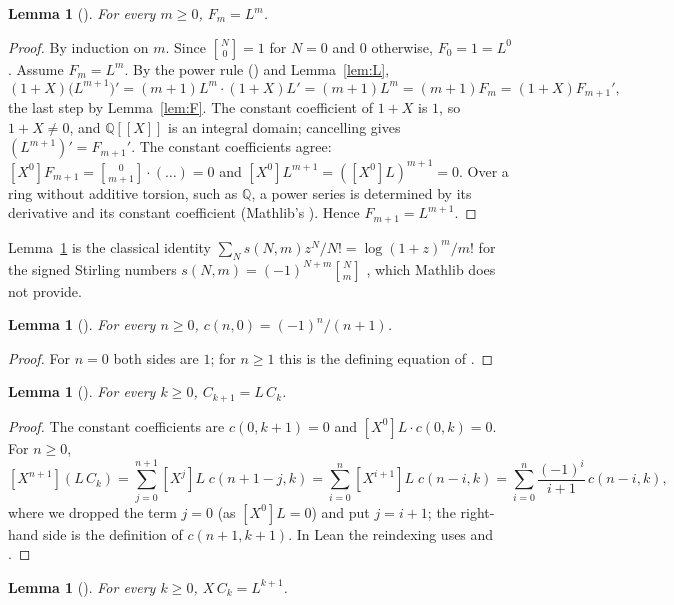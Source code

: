 \documentclass[11pt]{amsart}
\theoremstyle{plain}
\newtheorem{lemma}[theorem]{Lemma}
\theoremstyle{definition}
\newcommand{\Q}{\mathbb{Q}}
\newcommand{\st}[2]{\genfrac{[}{]}{0pt}{}{#1}{#2}}
\newcommand{\fps}{\Q[\![X]\!]}
\newcommand{\coef}[1]{[X^{#1}]}
\begin{document}
\begin{lemma}[]\label{lem:Feq}
For every $m\ge0$, $F_m=L^m$.
\end{lemma}

\begin{proof}
By induction on $m$. Since $\st N0=1$ for $N=0$ and $0$ otherwise, $F_0=1=L^0$.
Assume $F_m=L^m$. By the power rule () and Lemma~\ref{lem:L},
\[
  (1+X)\bigl(L^{m+1}\bigr)'=(m+1)L^m\cdot(1+X)L'=(m+1)L^m=(m+1)F_m=(1+X)F_{m+1}',
\]
the last step by Lemma~\ref{lem:F}. The constant coefficient of $1+X$ is $1$, so $1+X\neq0$, and $\fps$ is an integral domain; cancelling gives $(L^{m+1})'=F_{m+1}'$.
The constant coefficients agree: $\coef0F_{m+1}=\st0{m+1}\cdot(\dots)=0$ and $\coef0L^{m+1}=(\coef0L)^{m+1}=0$.
Over a ring without additive torsion, such as $\Q$, a power series is determined by its derivative and its constant coefficient (Mathlib's ). Hence $F_{m+1}=L^{m+1}$.
\end{proof}

Lemma~\ref{lem:Feq} is the classical identity $\sum_N s(N,m)z^N/N!=\log(1+z)^m/m!$ for the signed Stirling numbers $s(N,m)=(-1)^{N+m}\st Nm$ \cite{Co74}, which Mathlib does not provide.

\begin{lemma}[]\label{lem:c0}
For every $n\ge0$, $c(n,0)=(-1)^n/(n+1)$.
\end{lemma}

\begin{proof}
For $n=0$ both sides are $1$; for $n\ge1$ this is the defining equation of .
\end{proof}

\begin{lemma}[]\label{lem:Cs}
For every $k\ge0$, $C_{k+1}=L\,C_k$.
\end{lemma}

\begin{proof}
The constant coefficients are $c(0,k+1)=0$ and $\coef0L\cdot c(0,k)=0$. For $n\ge0$,
\[
  \coef{n+1}(L\,C_k)=\sum_{j=0}^{n+1}\coef jL\;c(n+1-j,k)=\sum_{i=0}^{n}\coef{i+1}L\;c(n-i,k)=\sum_{i=0}^{n}\frac{(-1)^i}{i+1}\,c(n-i,k),
\]
where we dropped the term $j=0$ (as $\coef0L=0$) and put $j=i+1$; the right-hand side is the definition of $c(n+1,k+1)$. In Lean the reindexing uses  and .
\end{proof}

\begin{lemma}[]\label{lem:XCs}
For every $k\ge0$, $X\,C_k=L^{k+1}$.
\end{lemma}
\end{document}
